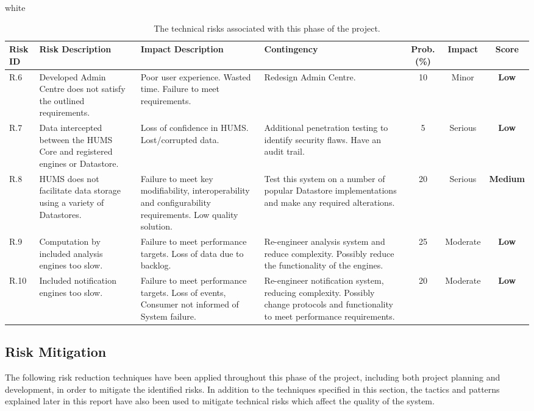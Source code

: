 \documentclass[10pt,a4paper]{article}
\newcommand{\tableformat}[4]{
\begin{table}[ht!]
\centering
  \rowcolors{2}{gray!10} {white}
\def\arraystretch{1.5}
\begin{tabularx}{\textwidth}{#1}
  \hline
  \rowcolor[gray]{0.9} #2
  \hline
\end{tabularx}
\caption{#3}
\label{#4}
\end{table}}
\begin{document}
\tableformat{ p{0.8cm} X X X c c c }
{ 	\hline
    Risk ID & Risk \newline Description & Impact \newline Description & Contingency & Prob. (\%) & Impact & Score \\
  	\hline
  
    R.6 & Developed Admin Centre does not satisfy the outlined requirements. & Poor user experience. Wasted time. Failure to meet requirements. & Redesign Admin Centre. & 10 & Minor & \textbf{Low} \\
    R.7 & Data intercepted between the HUMS Core and registered engines or Datastore. & Loss of confidence in HUMS. Lost/corrupted data. & Additional penetration testing to identify security flaws. Have an audit trail. & 5 & Serious &  \textbf{Low} \\
    R.8 & HUMS does not facilitate data storage using a variety of Datastores. & Failure to meet key modifiability, interoperability and configurability requirements. Low quality solution. & Test this system on a number of popular Datastore implementations and make any required alterations. & 20 & Serious & \textbf{Medium} \\
    R.9 & Computation by included analysis engines too slow. & Failure to meet performance targets. Loss of data due to backlog. & Re-engineer analysis system and reduce complexity. Possibly reduce the functionality of the engines. & 25 & Moderate & \textbf{Low} \\	
    R.10 & Included notification engines too slow. & Failure to meet performance targets. Loss of events, Consumer not informed of System failure. & Re-engineer notification system, reducing complexity. Possibly change protocols and functionality to meet performance requirements. & 20 & Moderate & \textbf{Low} \\	
}
{The technical risks associated with this phase of the project.}{tab:tech_risks}

\subsection{Risk Mitigation}
The following risk reduction techniques have been applied throughout this phase of the project, including both project planning and development, in order to mitigate the identified risks. In addition to the techniques specified in this section, the tactics and patterns explained later in this report have also been used to mitigate technical risks which affect the quality of the system.
\end{document}
